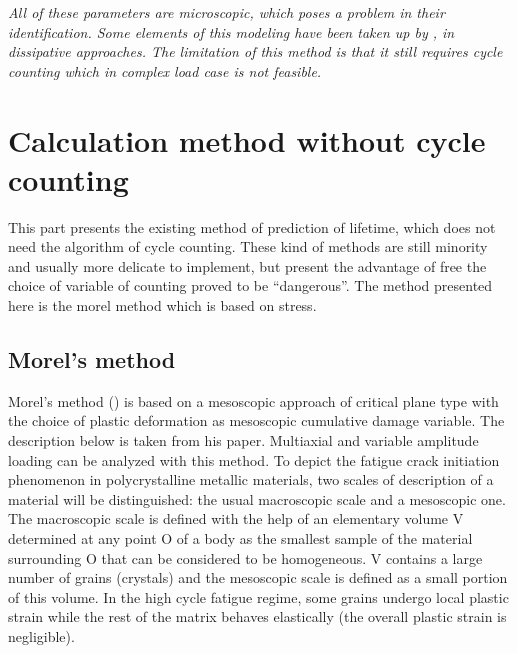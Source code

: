 \textit{All of these parameters are microscopic, which poses a problem in their identification. Some elements of this modeling have been taken up by \cite{charkaluk2009revisiting}, \cite{charkaluk2007approche} in dissipative approaches. The limitation of this method is that it still requires cycle counting which in complex load case is not feasible.}

\section{Calculation method without cycle counting}
This part presents the existing method of prediction of lifetime, which does not need the algorithm of cycle counting. These kind of methods are still minority and usually more delicate to implement, but present the advantage of free the choice of variable of counting proved to be ``dangerous''. The method presented here is the morel method which is based on stress.

\subsection{Morel's method}
Morel's method (\cite{Morel2000101}) is based on a mesoscopic approach of critical plane type with the
choice of plastic deformation as mesoscopic cumulative damage variable. The description below is taken from his paper. Multiaxial and variable amplitude loading can be analyzed with this method.
To depict the fatigue crack initiation phenomenon in polycrystalline metallic materials, two scales of description of a material will be distinguished: the usual macroscopic scale and a mesoscopic one. The macroscopic scale is defined with the help of an elementary volume
V determined at any point O of a body as the smallest sample of the material surrounding O that can be considered to be homogeneous. V contains a large number of grains (crystals) and the
mesoscopic scale is defined as a small portion of this
volume. In the high cycle fatigue regime, some grains
undergo local plastic strain while the rest of the matrix
behaves elastically (the overall plastic strain is
negligible).

